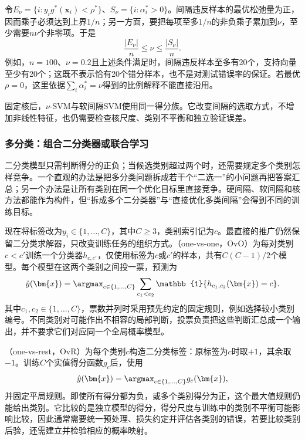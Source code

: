 令$E_\nu=\{i:y_i g^\ast(\bm{x}_i)<\rho^\ast\}$、$S_\nu=\{i:\alpha_i^\ast>0\}$。间隔违反样本的最优松弛量为正，因而乘子必须达到上界$1/n$；另一方面，要把每项至多$1/n$的非负乘子累加到$\nu$，至少需要$n\nu$个非零项。于是
\begin{equation}
  \frac{|E_\nu|}{n}\leq\nu\leq\frac{|S_\nu|}{n}.
  \label{eq:classification-nu-svm-proportions}
\end{equation}
例如，$n=100$、$\nu=0.2$且上述条件满足时，间隔违反样本至多有20个，支持向量至少有20个；这既不表示恰有20个错分样本，也不是对测试错误率的保证。若最优$\rho=0$，这里依据$\sum_i\alpha_i^\ast=\nu$得到的比例解释不能直接沿用。

固定核后，$\nu$-SVM与软间隔SVM使用同一得分族。它改变间隔的选取方式，不增加非线性特征，也仍需要检查核尺度、类别不平衡和独立验证误差。

\subsubsection{多分类：组合二分类器或联合学习}

\label{sec:classification-svm-multiclass}

二分类模型只需判断得分的正负；当候选类别超过两个时，还需要规定多个类别怎样竞争。一个直观的办法是把多分类问题拆成若干个“二选一”的小问题再把答案汇总；另一个办法是让所有类别在同一个优化目标里直接竞争。硬间隔、软间隔和核方法都能作为构件，但“拆成多个二分类器”与“直接优化多类间隔”会得到不同的训练目标。

现在将标签改为$y_i\in\{1,\ldots,C\}$，其中$C\ge3$，类别索引记为$c$。最直接的推广仍然保留二分类求解器，只改变训练任务的组织方式。（one-vs-one，OvO）为每对类别$c<c'$训练一个分类器$h_{c,c'}$，仅使用标签为$c$或$c'$的样本，共有$C(C-1)/2$个模型。每个模型在这两个类别之间投一票，预测为
\[
  \hat y(\bm{x})
  =\argmax_{c\in\{1,\ldots,C\}}
     \sum_{c_1<c_2}\mathbb{1}\{h_{c_1,c_2}(\bm{x})=c\}.
\]
其中$c_1,c_2\in\{1,\ldots,C\}$，票数并列时采用预先约定的固定规则，例如选择较小类别编号。不同类别对可能作出不相容的局部判断，投票负责把这些判断汇总成一个输出，并不要求它们对应同一个全局概率模型。

（one-vs-rest，OvR）为每个类别$c$构造二分类标签：原标签为$c$时取$+1$，其余取$-1$。训练$C$个实值得分函数$g_c$后，使用
\[
  \hat y(\bm{x})=\argmax_{c\in\{1,\ldots,C\}}g_c(\bm{x}),
\]
并固定平局规则。即使所有得分都为负，或多个类别得分为正，这个最大值规则仍能给出类别。它比较的是独立模型的得分，得分尺度与训练中的类别不平衡可能影响比较，因此通常需要统一预处理、损失约定并评估各类别的错误，若要比较类别后验，还需建立并检验相应的概率映射。

